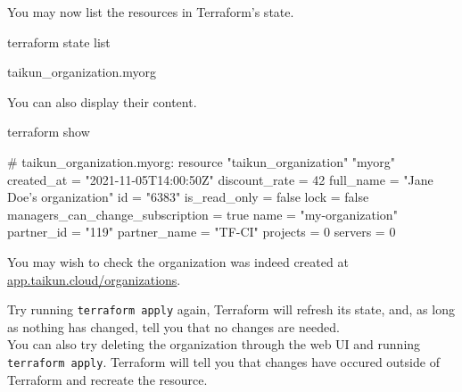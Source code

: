 You may now list the resources in Terraform's state.
\begin{shell}
terraform state list
\end{shell}
\begin{raw}
taikun_organization.myorg
\end{raw}
You can also display their content.
\begin{shell}
terraform show
\end{shell}
\begin{raw}
# taikun_organization.myorg:
resource "taikun_organization" "myorg" {
    created_at                       = "2021-11-05T14:00:50Z"
    discount_rate                    = 42
    full_name                        = "Jane Doe's organization"
    id                               = "6383"
    is_read_only                     = false
    lock                             = false
    managers_can_change_subscription = true
    name                             = "my-organization"
    partner_id                       = "119"
    partner_name                     = "TF-CI"
    projects                         = 0
    servers                          = 0
}
\end{raw}
You may wish to check the organization was indeed created at
\href{https://app.taikun.cloud/organizations}{app.taikun.cloud/organizations}.
\begin{tip}
Try running \texttt{terraform apply} again, Terraform will refresh its state, and, as long as
nothing has changed, tell you that no changes are needed.\\

You can also try deleting the organization through the web UI and running \texttt{terraform apply}.
Terraform will tell you that changes have occured outside of Terraform and recreate the resource.
\end{tip}
